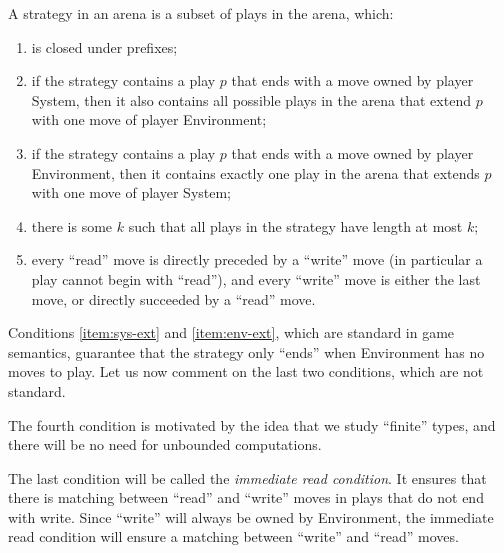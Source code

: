 \begin{definition}[Strategy]
    A strategy  in an arena  is a subset of plays in the arena, which: 
    \begin{enumerate}
        \item is closed under prefixes;
        \item\label{item:sys-ext} if the strategy contains a play $p$ that ends with a move owned by player System, then it also contains all possible plays  in the arena that extend $p$ with one move of player Environment;
        \item\label{item:env-ext} if the strategy contains a play $p$ that ends with a move owned by player Environment, then it contains exactly one play  in the arena that extends $p$ with one move of player System;
         \item there is some $k$ such that all plays in the strategy have length at most $k$;
        \item every ``read'' move is directly preceded by a ``write'' move (in particular a play cannot begin with ``read''), and every ``write'' move is either the last move, or directly succeeded by a ``read'' move.
    \end{enumerate}
\end{definition}

Conditions \ref{item:sys-ext} and \ref{item:env-ext}, which are standard in game semantics,  guarantee that the strategy only ``ends'' when 
Environment has no moves to play.  Let us now comment on the last two conditions, which are not standard.

The fourth condition is motivated by the idea that we study ``finite'' types,  and there will be no need for unbounded computations. 

The last condition will be called the  \emph{immediate read condition}. It ensures that there is matching between ``read'' and ``write'' moves in plays that do not end with write. Since ``write'' will always be owned by Environment, the immediate read condition will ensure a matching between ``write'' and ``read'' moves.

